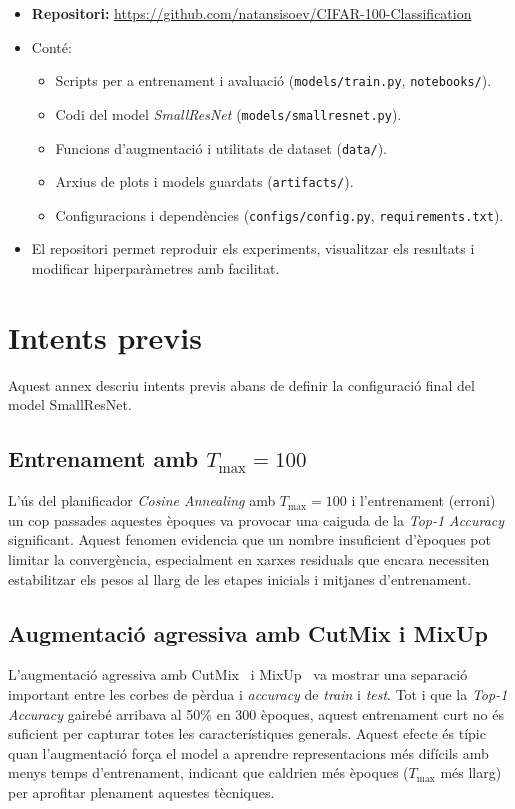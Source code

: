 \documentclass[9pt,a4paper,twoside]{tau-class/tau}
\begin{document}
    \begin{itemize}
        \item \textbf{Repositori:} \url{https://github.com/natansisoev/CIFAR-100-Classification}
        \item Conté:
        \begin{itemize}
            \item Scripts per a entrenament i avaluació (\texttt{models/train.py}, \texttt{notebooks/}).
            \item Codi del model \textit{SmallResNet} (\texttt{models/smallresnet.py}).
            \item Funcions d'augmentació i utilitats de dataset (\texttt{data/}).
            \item Arxius de plots i models guardats (\texttt{artifacts/}).
            \item Configuracions i dependències (\texttt{configs/config.py}, \texttt{requirements.txt}).
        \end{itemize}
        \item El repositori permet reproduir els experiments, visualitzar els resultats i modificar hiperparàmetres amb facilitat.
    \end{itemize}

\section{Intents previs}
\label{sec:annex_failed_attempts}

Aquest annex descriu intents previs abans de definir la configuració final del model SmallResNet.
    
    \subsection*{Entrenament amb $T_{\max}=100$}
        L'ús del planificador \textit{Cosine Annealing} amb $T_{\max}=100$ i l'entrenament (erroni) un cop passades aquestes èpoques va provocar una caiguda de la \textit{Top-1 Accuracy} significant. Aquest fenomen evidencia que un nombre insuficient d'èpoques pot limitar la convergència, especialment en xarxes residuals que encara necessiten estabilitzar els pesos al llarg de les etapes inicials i mitjanes d'entrenament.
    
    \subsection*{Augmentació agressiva amb CutMix i MixUp}
        L'augmentació agressiva amb CutMix~\cite{yun2019cutmix} i MixUp~\cite{zhang2017mixup} va mostrar una separació important entre les corbes de pèrdua i \textit{accuracy} de \textit{train} i \textit{test}. Tot i que la \textit{Top-1 Accuracy} gairebé arribava al 50\% en 300 èpoques, aquest entrenament curt no és suficient per capturar totes les característiques generals. Aquest efecte és típic quan l'augmentació força el model a aprendre representacions més difícils amb menys temps d'entrenament, indicant que caldrien més èpoques ($T_{\max}$ més llarg) per aprofitar plenament aquestes tècniques.
\end{document}
